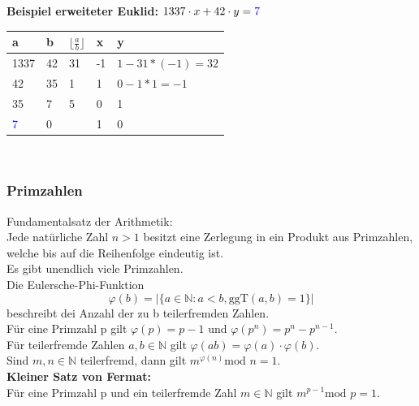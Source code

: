 \documentclass[a4paper,12pt]{article}
\newcommand{\blue}[1]{\textcolor{blue}{#1}}
\begin{document}
\textbf{Beispiel erweiteter Euklid:}
$1337\cdot x+42\cdot y=\blue{7}$\\
\begin{tabular}{|l|l|l|l|l|}
a & b & $\lfloor \frac{a}{b} \rfloor$ & x & y\\
\hline
1337 & 42 & 31 & -1 & $1-31*(-1)=32$\\
\hline
42 & 35 & 1 & 1 & $0-1*1=-1$\\
\hline
35 & 7 & 5 & 0 & 1\\
\hline
\blue{7} & 0 & & 1 & 0
\end{tabular}\\
\subsubsection{Primzahlen}
Fundamentalsatz der Arithmetik:\\
Jede natürliche Zahl $n>1$ besitzt eine Zerlegung in ein Produkt aus Primzahlen, welche bis auf die Reihenfolge eindeutig ist.\\
Es gibt unendlich viele Primzahlen.\\

Die Eulersche-Phi-Funktion $$\varphi (b)=|\{a\in\mathbb{N} : a < b, \textrm{ggT}(a,b)=1\}|$$ beschreibt dei Anzahl der zu b teilerfremden Zahlen.\\
Für eine Primzahl p gilt $\varphi (p)=p-1$ und $\varphi (p^n)=p^n-p^{n-1}$.\\
Für teilerfremde Zahlen $a,b\in \mathbb{N}$ gilt $\varphi (ab)=\varphi (a)\cdot \varphi (b)$.\\
Sind $m,n\in \mathbb{N}$ teilerfremd, dann gilt $m^{\varphi (n)}\textrm{mod }n= 1$.\\
\textbf{Kleiner Satz von Fermat:}\\
Für eine Primzahl p und ein teilerfremde Zahl $m\in \mathbb{N}$ gilt $m^{p-1} \textrm{mod }p = 1$.
\end{document}
